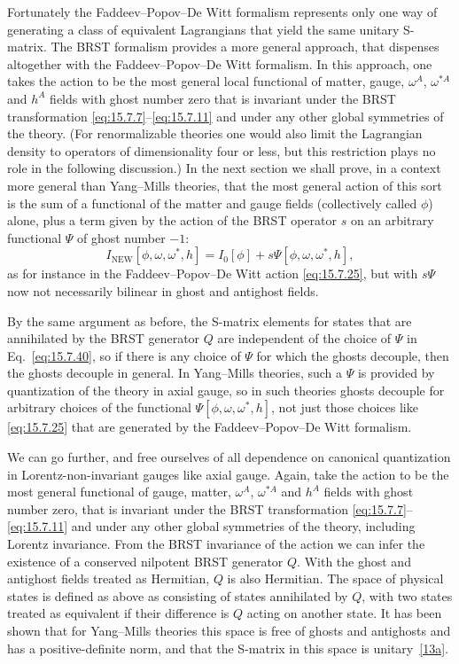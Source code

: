 Fortunately the Faddeev--Popov--De Witt formalism represents only one way of generating a class of equivalent Lagrangians that yield the same unitary S-matrix. The BRST formalism provides a more general approach, that dispenses altogether with the Faddeev--Popov--De Witt formalism. In this approach, one takes the action to be the most general local functional of matter, gauge, $\omega^A$, $\omega^{*A}$ and $h^A$ fields with ghost number zero that is invariant under the BRST transformation \eqref{eq:15.7.7}--\eqref{eq:15.7.11} and under any other global symmetries of the theory. (For renormalizable theories one would also limit the Lagrangian density to operators of dimensionality four or less, but this restriction plays no role in the following discussion.) In the next section we shall prove, in a context more general than Yang--Mills theories, that the most general action of this sort is the sum of a functional of the matter and gauge fields (collectively called $\phi$) alone, plus a term given by the action of the BRST operator $s$ on an arbitrary functional $\Psi$ of ghost number $-1$:
\begin{equation}
 I_{\mathrm{NEW}}[\phi,\omega,\omega^*,h]
 =I_0[\phi]+s\Psi[\phi,\omega,\omega^*,h],
 \tag{15.7.40}\label{eq:15.7.40}
\end{equation}
as for instance in the Faddeev--Popov--De Witt action \eqref{eq:15.7.25}, but with $s\Psi$ now not necessarily bilinear in ghost and antighost fields.

By the same argument as before, the S-matrix elements for states that are annihilated by the BRST generator $Q$ are independent of the choice of $\Psi$ in Eq.~\eqref{eq:15.7.40}, so if there is any choice of $\Psi$ for which the ghosts decouple, then the ghosts decouple in general. In Yang--Mills theories, such a $\Psi$ is provided by quantization of the theory in axial gauge, so in such theories ghosts decouple for arbitrary choices of the functional $\Psi[\phi,\omega,\omega^*,h]$, not just those choices like \eqref{eq:15.7.25} that are generated by the Faddeev--Popov--De Witt formalism.

We can go further, and free ourselves of all dependence on canonical quantization in Lorentz-non-invariant gauges like axial gauge. Again, take the action to be the most general functional of gauge, matter, $\omega^A$, $\omega^{*A}$ and $h^A$ fields with ghost number zero, that is invariant under the BRST transformation \eqref{eq:15.7.7}--\eqref{eq:15.7.11} and under any other global symmetries of the theory, including Lorentz invariance. From the BRST invariance of the action we can infer the existence of a conserved nilpotent BRST generator $Q$. With the ghost and antighost fields treated as Hermitian, $Q$ is also Hermitian. The space of physical states is defined as above as consisting of states annihilated by $Q$, with two states treated as equivalent if their difference is $Q$ acting on another state. It has been shown that for Yang--Mills theories this space is free of ghosts and antighosts and has a positive-definite norm, and that the S-matrix in this space is unitary~\hyperref[ch15-ref-13a]{[13a]}.

